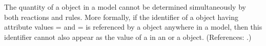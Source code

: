 The quantity of a \Species object in a model cannot be determined
simultaneously by both reactions and rules.  More formally, if the
identifier of a \Species object having attribute values
= and = is
referenced by a \SpeciesReference object anywhere in a model, then this
identifier cannot also appear as the value of a  in an
\AssignmentRule or a \RateRule object.  (References: .)
